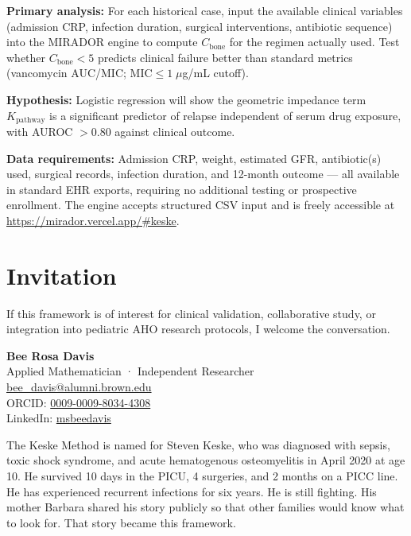 \documentclass[11pt]{article}
\begin{document}
\textbf{Primary analysis:} For each historical case, input the available clinical
variables (admission CRP, infection duration, surgical interventions, antibiotic
sequence) into the MIRADOR engine to compute $C_{\text{bone}}$ for the regimen
actually used. Test whether $C_{\text{bone}} < 5$ predicts clinical failure
better than standard metrics (vancomycin AUC/MIC; $\text{MIC} \leq 1\;\mu$g/mL
cutoff).

\textbf{Hypothesis:} Logistic regression will show the geometric impedance term
$K_{\text{pathway}}$ is a significant predictor of relapse independent of serum
drug exposure, with AUROC $> 0.80$ against clinical outcome.

\textbf{Data requirements:} Admission CRP, weight, estimated GFR, antibiotic(s)
used, surgical records, infection duration, and 12-month outcome — all available
in standard EHR exports, requiring no additional testing or prospective
enrollment. The engine accepts structured CSV input and is freely accessible at
\url{https://mirador.vercel.app/\#keske}.

\section{Invitation}

If this framework is of interest for clinical validation, collaborative study, or
integration into pediatric AHO research protocols, I welcome the conversation.

\medskip
\noindent
\textbf{Bee Rosa Davis}\\
Applied Mathematician · Independent Researcher\\
\href{mailto:bee_davis@alumni.brown.edu}{bee\_davis@alumni.brown.edu}\\
ORCID: \href{https://orcid.org/0009-0009-8034-4308}{0009-0009-8034-4308}\\
LinkedIn: \href{https://www.linkedin.com/in/msbeedavis/}{msbeedavis}

\vspace{10pt}
{\small\color{muted}
The Keske Method is named for Steven Keske, who was diagnosed with sepsis,
toxic shock syndrome, and acute hematogenous osteomyelitis in April 2020 at age
10. He survived 10 days in the PICU, 4 surgeries, and 2 months on a PICC line.
He has experienced recurrent infections for six years. He is still fighting.
His mother Barbara shared his story publicly so that other families would know
what to look for. That story became this framework.
}
\end{document}
